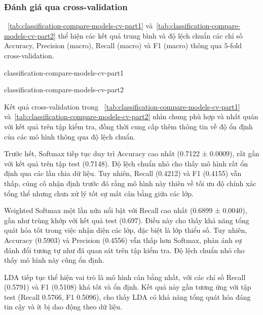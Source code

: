 \subsubsection{Đánh giá qua cross-validation}

\tablename~\ref{tab:classification-compare-models-cv-part1}
và~\ref{tab:classification-compare-models-cv-part2} thể hiện các kết quả trung
bình và độ lệch chuẩn các chỉ số Accuracy, Precision (macro), Recall (macro) và
F1 (macro) thông qua $5$-fold cross-validation.

\begin{table}[htbp]
  \centering
  \caption{Kết quả trung bình và độ lệch chuẩn các chỉ số của các mô hình
  thông qua cross-validation (phần 1)}
  {classification-compare-models-cv-part1}
  \label{tab:classification-compare-models-cv-part1}
\end{table}

\begin{table}[htbp]
  \centering
  \caption{Kết quả trung bình và độ lệch chuẩn các chỉ số của các mô hình
  thông qua cross-validation (phần 2)}
  {classification-compare-models-cv-part2}
  \label{tab:classification-compare-models-cv-part2}
\end{table}

Kết quả cross-validation trong
\tablename~\ref{tab:classification-compare-models-cv-part1}
và~\ref{tab:classification-compare-models-cv-part2} nhìn chung phù hợp và nhất
quán với kết quả trên tập kiểm tra, đồng thời cung cấp thêm thông tin về độ ổn
định của các mô hình thông qua độ lệch chuẩn.

Trước hết, Softmax tiếp tục duy trì Accuracy cao nhất (0.7122 ± 0.0009), rất
gần với kết quả trên tập test (0.7148). Độ lệch chuẩn nhỏ cho thấy mô hình rất
ổn định qua các lần chia dữ liệu. Tuy nhiên, Recall (0.4212) và F1 (0.4155) vẫn
thấp, củng cố nhận định trước đó rằng mô hình này thiên về tối ưu độ chính xác
tổng thể nhưng chưa xử lý tốt sự mất cân bằng giữa các lớp.

Weighted Softmax một lần nữa nổi bật với Recall cao nhất (0.6899 ± 0.0040), gần
như trùng khớp với kết quả test (0.697). Điều này cho thấy khả năng tổng quát
hóa tốt trong việc nhận diện các lớp, đặc biệt là lớp thiểu số. Tuy nhiên,
Accuracy (0.5903) và Precision (0.4556) vẫn thấp hơn Softmax, phản ánh sự đánh
đổi tương tự như đã quan sát trên tập kiểm tra. Độ lệch chuẩn nhỏ cho thấy mô
hình này cũng ổn định.

LDA tiếp tục thể hiện vai trò là mô hình cân bằng nhất, với các chỉ số Recall
(0.5791) và F1 (0.5108) khá tốt và ổn định. Kết quả này gần tương ứng với tập
test (Recall 0.5766, F1 0.5096), cho thấy LDA có khả năng tổng quát hóa đáng
tin cậy và ít bị dao động theo dữ liệu.

